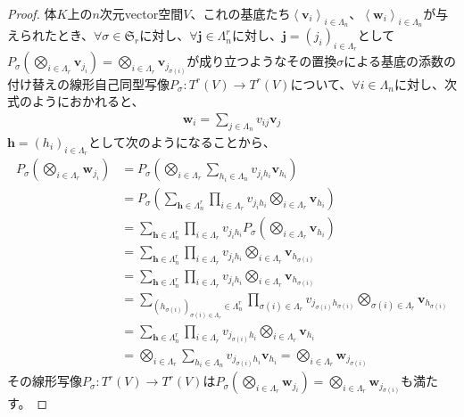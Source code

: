 \documentclass[dvipdfmx]{jsarticle}
\begin{document}
\begin{proof}
体$K$上の$n$次元vector空間$V$、これの基底たち$\left\langle \mathbf{v}_{i} \right\rangle_{i \in \varLambda_{n}}$、$\left\langle \mathbf{w}_{i} \right\rangle_{i \in \varLambda_{n}}$が与えられたとき、$\forall\sigma \in \mathfrak{S}_{r}$に対し、$\forall\mathbf{j} \in \varLambda_{n}^{r}$に対し、$\mathbf{j}=\left( j_{i} \right)_{i \in \varLambda_{r}}$として$P_{\sigma}\left( \bigotimes_{i \in \varLambda_{r}} \mathbf{v}_{j_{i}} \right) = \bigotimes_{i \in \varLambda_{r}} \mathbf{v}_{j_{\sigma(i)}}$が成り立つようなその置換$\sigma$による基底の添数の付け替えの線形自己同型写像$P_{\sigma}:T^{r}(V) \rightarrow T^{r}(V)$について、$\forall i \in \varLambda_{n}$に対し、次式のようにおかれると、
\begin{align*}
\mathbf{w}_{i} = \sum_{j \in \varLambda_{n}} {v_{ij}\mathbf{v}_{j}}
\end{align*}
$\mathbf{h} =\left( h_{i} \right)_{i \in \varLambda_{r}}$として次のようになることから、
\begin{align*}
P_{\sigma}\left( \bigotimes_{i \in \varLambda_{r}} \mathbf{w}_{j_{i}} \right) &= P_{\sigma}\left( \bigotimes_{i \in \varLambda_{r}} {\sum_{h_{i} \in \varLambda_{n}} {v_{j_{i}h_{i}}\mathbf{v}_{h_{i}}}} \right)\\
&= P_{\sigma}\left( \sum_{\mathbf{h} \in \varLambda_{n}^{r}} {\prod_{i \in \varLambda_{r}} v_{j_{i}h_{i}}\bigotimes_{i \in \varLambda_{r}} \mathbf{v}_{h_{i}}} \right)\\
&= \sum_{\mathbf{h} \in \varLambda_{n}^{r}} {\prod_{i \in \varLambda_{r}} v_{j_{i}h_{i}}P_{\sigma}\left( \bigotimes_{i \in \varLambda_{r}} \mathbf{v}_{h_{i}} \right)}\\
&= \sum_{\mathbf{h} \in \varLambda_{n}^{r}} {\prod_{i \in \varLambda_{r}} v_{j_{i}h_{i}}\bigotimes_{i \in \varLambda_{r}} \mathbf{v}_{h_{\sigma(i)}}}\\
&= \sum_{\mathbf{h} \in \varLambda_{n}^{r}} {\prod_{i \in \varLambda_{r}} v_{j_{i}h_{i}}\bigotimes_{i \in \varLambda_{r}} \mathbf{v}_{h_{\sigma(i)}}}\\
&= \sum_{\left( h_{\sigma(i)} \right)_{\sigma(i) \in \varLambda_{r}} \in \varLambda_{n}^{r}} {\prod_{\sigma(i) \in \varLambda_{r}} v_{j_{\sigma(i)}h_{\sigma(i)}}\bigotimes_{\sigma(i) \in \varLambda_{r}} \mathbf{v}_{h_{\sigma(i)}}}\\
&= \sum_{\mathbf{h} \in \varLambda_{n}^{r}} {\prod_{i \in \varLambda_{r}} v_{j_{\sigma(i)}h_{i}}\bigotimes_{i \in \varLambda_{r}} \mathbf{v}_{h_{i}}}\\
&= \bigotimes_{i \in \varLambda_{r}} {\sum_{h_{i} \in \varLambda_{n}} {v_{j_{\sigma(i)}h_{i}}\mathbf{v}_{h_{i}}}} = \bigotimes_{i \in \varLambda_{r}} \mathbf{w}_{j_{\sigma(i)}}
\end{align*}
その線形写像$P_{\sigma}:T^{r}(V) \rightarrow T^{r}(V)$は$P_{\sigma}\left( \bigotimes_{i \in \varLambda_{r}} \mathbf{w}_{j_{i}} \right) = \bigotimes_{i \in \varLambda_{r}} \mathbf{w}_{j_{\sigma(i)}}$も満たす。
\end{proof}
\end{document}
